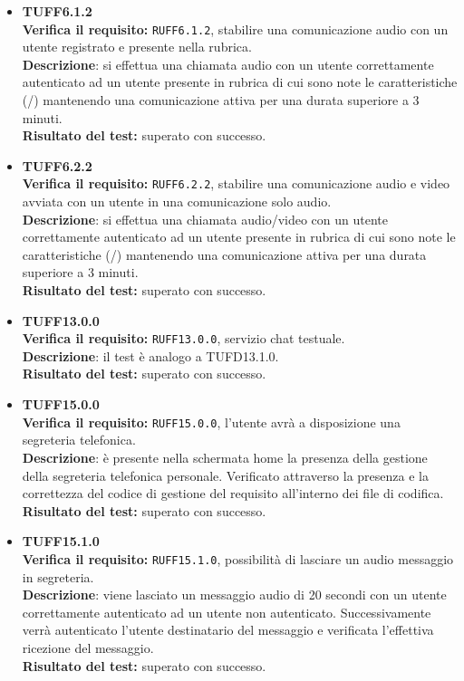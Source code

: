 \begin{itemize}
\item \textbf{TUFF6.1.2}\\ 
\textbf{Verifica il requisito:} \texttt{RUFF6.1.2}, stabilire una comunicazione audio con un utente registrato e presente nella rubrica.\\
\textbf{Descrizione}: si effettua una chiamata audio con un utente  correttamente autenticato ad un utente  presente in rubrica di cui sono note le caratteristiche (/) mantenendo una comunicazione attiva per una durata superiore a 3 minuti.\\
\textbf{Risultato del test:} superato con successo.

\item \textbf{TUFF6.2.2}\\
\textbf{Verifica il requisito:} \texttt{RUFF6.2.2}, stabilire una comunicazione audio e video avviata con un utente in una comunicazione solo audio.\\
\textbf{Descrizione}: si effettua una chiamata audio/video con un utente  correttamente autenticato ad un utente  presente in rubrica di cui sono note le caratteristiche (/) mantenendo una comunicazione attiva per una durata superiore a 3 minuti.\\
\textbf{Risultato del test:} superato con successo.

\item \textbf{TUFF13.0.0}\\
\textbf{Verifica il requisito:} \texttt{RUFF13.0.0}, servizio chat testuale.\\
\textbf{Descrizione}: il test è analogo a TUFD13.1.0.\\
\textbf{Risultato del test:} superato con successo.

\item \textbf{TUFF15.0.0}\\
\textbf{Verifica il requisito:} \texttt{RUFF15.0.0}, l'utente avrà a disposizione una segreteria telefonica.\\
\textbf{Descrizione}: è presente nella schermata home la presenza della gestione della segreteria telefonica personale. Verificato attraverso la presenza e la correttezza del codice di gestione del requisito all'interno dei file di codifica.\\
\textbf{Risultato del test:} superato con successo.

\item \textbf{TUFF15.1.0}\\
\textbf{Verifica il requisito:} \texttt{RUFF15.1.0}, possibilità di lasciare un audio messaggio in segreteria.\\
\textbf{Descrizione}: viene lasciato un messaggio audio di 20 secondi con un utente  correttamente autenticato ad un utente  non autenticato. Successivamente verrà autenticato l'utente  destinatario del messaggio e verificata l'effettiva ricezione del messaggio.\\
\textbf{Risultato del test:} superato con successo.


\end{itemize}
